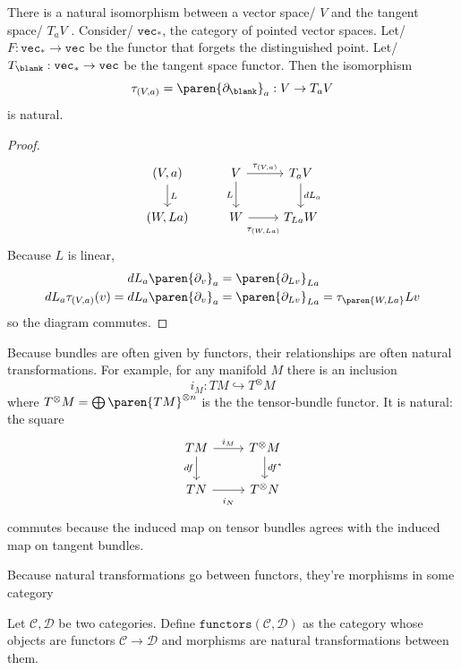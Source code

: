 \documentclass[a5paper]{scrartcl}
\def\cat{\mathcal{C}}
\def\dee{\mathcal{D}}
\def\veccat{\texttt{vec}}
\begin{document}
\begin{theorem}
  There is a natural isomorphism between a vector space\eit/ \(V\) and the tangent space\eit/ \(T_a V\) \cite[59]{lee-smooth}. Consider\eit/ \(\veccat_*\), the category of pointed vector spaces. Let\eit/ \(F: \veccat_* \to \veccat\) be the functor that forgets the distinguished point. Let\eit/ \(T_\blank : \veccat_* \to \veccat\) be the tangent space functor. Then the isomorphism
  \[
    \tau_{(V,a)} = \paren{\partial_\blank}_a: V \to T_a V
  \]
  is natural.
\end{theorem}
\begin{proof}
  \[
    \begin{tikzcd}
      (V,a)\dar{L} & V\dar[swap]{L}\rar{\tau_{(V,a)}} & T_a V\dar{dL_a} \\
      (W,La) & W \rar[swap]{\strut\tau_{(W,La)}}& T_{La} W
    \end{tikzcd}
  \]
  Because \(L\) is linear,
  \begin{align*}
    dL_a\paren{\partial_v}_a &= \paren{\partial_{Lv}}_{La} \\
    dL_a \tau_{(V,a)} (v) = dL_a\paren{\partial_v}_a &= \paren{\partial_{Lv}}_{La} = \tau_{\paren{W,La}} Lv
  \end{align*}
  so the diagram commutes.
\end{proof}

Because bundles are often given by functors, their relationships are often natural transformations. For example, for any manifold \(M\) there is an inclusion
\[
  i_M : TM \hookrightarrow T^\otimes M
\]
where \(T^\otimes M = \bigoplus \paren{TM}^{\otimes n}\) is the the tensor-bundle functor. It is natural: the square
\[
  \begin{tikzcd}
    TM\dar[swap]{df} \rar{i_M} & T^\otimes M\dar{df^*} \\
    TN \rar[swap]{\strut i_N} & T^\otimes N
  \end{tikzcd}
\]
commutes because the induced map on tensor bundles agrees with the induced map on tangent bundles.

Because natural transformations go between functors, they're morphisms in some category
\begin{defn}
  Let \(\cat,\dee\) be two categories. Define \(\texttt{functors}(\cat,\dee)\) as the category whose objects are functors \(\cat\to\dee\) and morphisms are natural transformations between them.
\end{defn}
\end{document}
